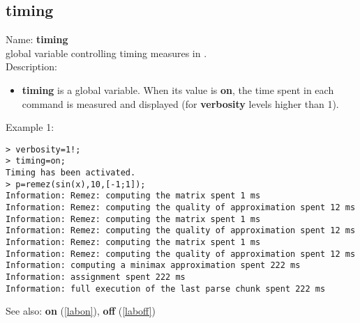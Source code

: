 \subsection{timing}
\label{labtiming}
\noindent Name: \textbf{timing}\\
global variable controlling timing measures in \sollya.\\
\noindent Description: \begin{itemize}

\item \textbf{timing} is a global variable. When its value is \textbf{on}, the time spent in each 
   command is measured and displayed (for \textbf{verbosity} levels higher than 1).
\end{itemize}
\noindent Example 1: 
\begin{center}\begin{minipage}{15cm}\begin{Verbatim}[frame=single]
> verbosity=1!;
> timing=on;
Timing has been activated.
> p=remez(sin(x),10,[-1;1]);
Information: Remez: computing the matrix spent 1 ms
Information: Remez: computing the quality of approximation spent 12 ms
Information: Remez: computing the matrix spent 1 ms
Information: Remez: computing the quality of approximation spent 12 ms
Information: Remez: computing the matrix spent 1 ms
Information: Remez: computing the quality of approximation spent 12 ms
Information: computing a minimax approximation spent 222 ms
Information: assignment spent 222 ms
Information: full execution of the last parse chunk spent 222 ms
\end{Verbatim}
\end{minipage}\end{center}
See also: \textbf{on} (\ref{labon}), \textbf{off} (\ref{laboff})
